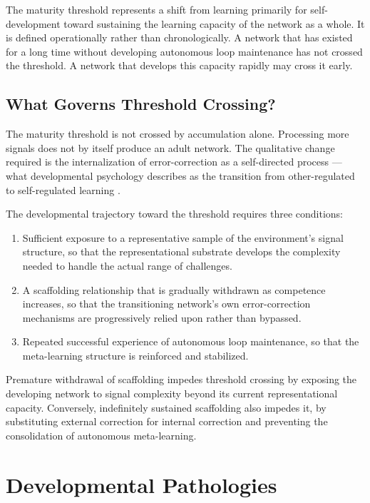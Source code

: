 \documentclass[11pt]{article}
\begin{document}
The maturity threshold represents a shift from learning primarily for self-development toward
sustaining the learning capacity of the network as a whole. It is defined operationally
rather than chronologically. A network that has existed for a long time without developing
autonomous loop maintenance has not crossed the threshold. A network that develops this
capacity rapidly may cross it early.

\subsection{What Governs Threshold Crossing?}

The maturity threshold is not crossed by accumulation alone. Processing more signals does not
by itself produce an adult network. The qualitative change required is the internalization of
error-correction as a self-directed process --- what developmental psychology describes as the
transition from other-regulated to self-regulated learning \cite{vygotsky1978}.

The developmental trajectory toward the threshold requires three conditions:

\begin{enumerate}
    \item Sufficient exposure to a representative sample of the environment's signal
          structure, so that the representational substrate develops the complexity needed to
          handle the actual range of challenges.
    \item A scaffolding relationship that is gradually withdrawn as competence increases,
          so that the transitioning network's own error-correction mechanisms are progressively
          relied upon rather than bypassed.
    \item Repeated successful experience of autonomous loop maintenance, so that the
          meta-learning structure is reinforced and stabilized.
\end{enumerate}

Premature withdrawal of scaffolding impedes threshold crossing by exposing the developing
network to signal complexity beyond its current representational capacity. Conversely,
indefinitely sustained scaffolding also impedes it, by substituting external correction for
internal correction and preventing the consolidation of autonomous meta-learning.

\section{Developmental Pathologies}
\label{sec:pathologies}
\end{document}
